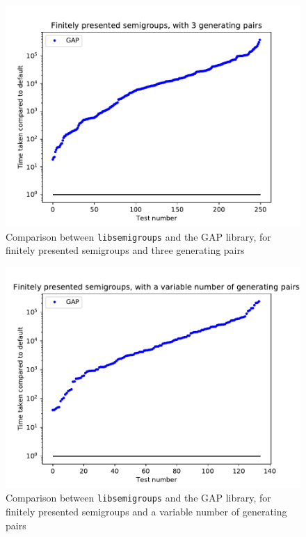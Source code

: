 \begin{figure}[h]
  \centering
  \includegraphics[width=\textwidth]{pics/ch-pairs/bench-fp-3p-gap}
  \caption[Benchmark: GAP/\texttt{libsemigroups}, finitely presented, 3 pairs]
  {Comparison between \texttt{libsemigroups} and the GAP library, for
    finitely presented semigroups and three generating pairs}
  \label{fig:bench-fp-3p-gap}
\end{figure}

\begin{figure}[h]
  \centering
  \includegraphics[width=\textwidth]{pics/ch-pairs/bench-fp-vp-gap}
  \caption[Benchmark: GAP/\texttt{libsemigroups}, finitely presented, $n$ pairs]
  {Comparison between \texttt{libsemigroups} and the GAP library, for
    finitely presented semigroups and a variable number of generating pairs}
  \label{fig:bench-fp-vp-gap}
\end{figure}

